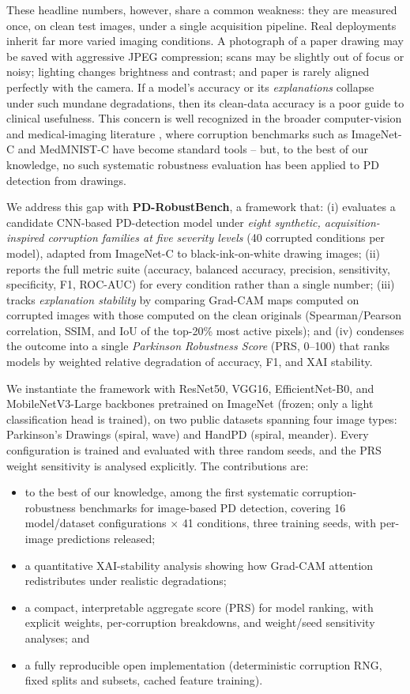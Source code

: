 \documentclass[11pt,a4paper]{article}
\begin{document}
These headline numbers, however, share a common weakness: they are measured
once, on clean test images, under a single acquisition pipeline. Real
deployments inherit far more varied imaging conditions. A photograph of a
paper drawing may be saved with aggressive JPEG compression; scans may be
slightly out of focus or noisy; lighting changes brightness and contrast; and
paper is rarely aligned perfectly with the camera. If a model's accuracy or
its \emph{explanations} collapse under such mundane degradations, then its
clean-data accuracy is a poor guide to clinical usefulness. This concern is
well recognized in the broader computer-vision and medical-imaging literature
\cite{hendrycks2019,javed2024,boone2023}, where corruption benchmarks such as
ImageNet-C \cite{hendrycks2019} and MedMNIST-C have become standard tools --
but, to the best of our knowledge, no such systematic robustness evaluation
has been applied to PD detection from drawings.

We address this gap with \textbf{PD-RobustBench}, a framework that:
(i) evaluates a candidate CNN-based PD-detection model under \emph{eight
synthetic, acquisition-inspired corruption families at five severity levels}
(40 corrupted conditions per model), adapted
from ImageNet-C to black-ink-on-white drawing images;
(ii) reports the full metric suite (accuracy, balanced accuracy, precision,
sensitivity, specificity, F1, ROC-AUC) for every condition rather than a
single number;
(iii) tracks \emph{explanation stability} by comparing Grad-CAM maps computed
on corrupted images with those computed on the clean originals (Spearman/Pearson
correlation, SSIM, and IoU of the top-20\% most active pixels); and
(iv) condenses the outcome into a single \emph{Parkinson Robustness Score}
(PRS, 0--100) that ranks models by weighted relative degradation of accuracy,
F1, and XAI stability.

We instantiate the framework with ResNet50, VGG16, EfficientNet-B0, and
MobileNetV3-Large
backbones pretrained on ImageNet (frozen; only a light classification head is
trained), on two public datasets spanning four image types: Parkinson's
Drawings (spiral, wave) and HandPD (spiral, meander). Every configuration is
trained and evaluated with three random seeds, and the PRS weight
sensitivity is analysed explicitly. The contributions are:
\begin{itemize}
\item to the best of our knowledge, among the first systematic
corruption-robustness benchmarks for image-based PD detection, covering 16
model/dataset configurations $\times$ 41 conditions, three training seeds,
with per-image predictions
released;
\item a quantitative XAI-stability analysis showing how Grad-CAM attention
redistributes under realistic degradations;
\item a compact, interpretable aggregate score (PRS) for model ranking, with
explicit weights, per-corruption breakdowns, and weight/seed sensitivity
analyses; and
\item a fully reproducible open implementation (deterministic corruption
RNG, fixed splits and subsets, cached feature training).
\end{itemize}
\end{document}
